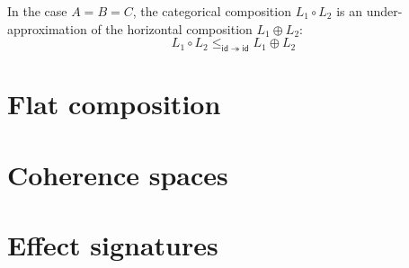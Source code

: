 \documentclass{article}
\begin{document}
In the case $A = B = C$,
the categorical composition $L_1 \circ L_2$
is an under-approximation of
the horizontal composition $L_1 \oplus L_2$:
\[
    L_1 \circ L_2
    \le_{\mathsf{id} \twoheadrightarrow \mathsf{id}}
    L_1 \oplus L_2
\]




\section{Flat composition}

\section{Coherence spaces}

\section{Effect signatures}
\end{document}
